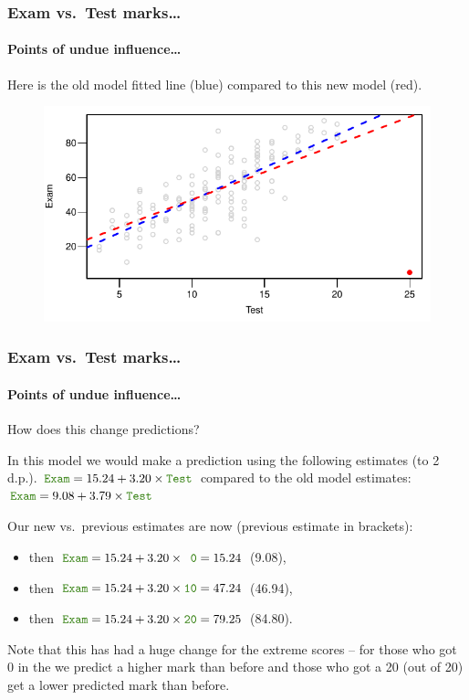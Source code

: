 \documentclass{beamer}\usepackage[]{graphicx}\usepackage[]{xcolor}
\begin{document}
\begin{frame}[fragile]
\frametitle{Exam vs.\ Test marks\ldots}
\framesubtitle{Points of undue influence\ldots}
Here is the old model fitted line ({\color{blue}blue}) compared to this new model ({\color{red}red}). \\
\phantom{A space}


\begin{figure}
  \centering
  \includegraphics{figure/RC-H02-020}
\end{figure}

\end{frame}


\begin{frame}[fragile]
\frametitle{Exam vs.\ Test marks\ldots}

\framesubtitle{Points of undue influence\ldots}


How does this change predictions?

In this model we would make a prediction using the following estimates (to 2 d.p.).
 $\rcode{Exam}= 15.24 +3.20 \times\rcode{Test}$ compared to the old model estimates:
 $\rcode{Exam}= 9.08 +3.79 \times\rcode{Test}$

Our new vs.\ previous estimates are now (previous estimate in brackets):

\begin{itemize}
\item {} then $\rcode{Exam}= 15.24 +3.20\times\rcode{\phantom{0}0} = 15.24$  (\phantom{0}9.08),
\item {} then $\rcode{Exam}= 15.24 +3.20\times\rcode{10} = 47.24$ (46.94),
\item {} then $\rcode{Exam}= 15.24 +3.20\times\rcode{20} = 79.25 $ (84.80).
\end{itemize}

Note that this has had a huge change for the extreme  scores -- for those who got 0 in the  we predict a higher mark than before and those who got a 20 (out of 20) get a lower predicted mark than before. 
\end{frame}
\end{document}
